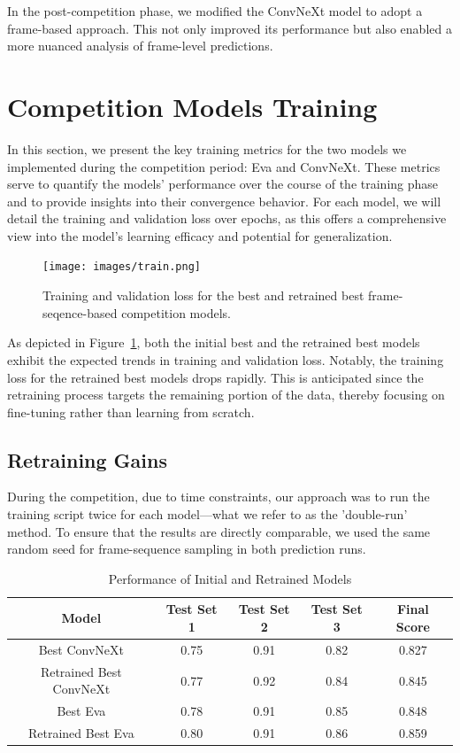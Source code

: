 \documentclass[a4paper,12pt,openright]{book}
\begin{document}
In the post-competition phase, we modified the ConvNeXt model to adopt a frame-based approach. This not only improved its performance but also enabled a more nuanced analysis of frame-level predictions.


\section{Competition Models Training}
In this section, we present the key training metrics for the two models we implemented during the competition period: Eva and ConvNeXt. These metrics serve to quantify the models' performance over the course of the training phase and to provide insights into their convergence behavior. For each model, we will detail the training and validation loss over epochs, as this offers a comprehensive view into the model's learning efficacy and potential for generalization.

\begin{figure}[!htb]
\centering
\texttt{[image: images/train.png]}
\caption{Training and validation loss for the best and retrained best frame-seqence-based competition models.}
\label{fig:training_validation_loss}
\end{figure}

As depicted in Figure~\ref{fig:training_validation_loss}, both the initial best and the retrained best models exhibit the expected trends in training and validation loss. Notably, the training loss for the retrained best models drops rapidly. This is anticipated since the retraining process targets the remaining portion of the data, thereby focusing on fine-tuning rather than learning from scratch.

\subsection{Retraining Gains}
During the competition, due to time constraints, our approach was to run the training script twice for each model—what we refer to as the 'double-run' method. To ensure that the results are directly comparable, we used the same random seed for frame-sequence sampling in both prediction runs.
\begin{table}[!htb]
\centering


\label{tab:retraining_gains}
\begin{tabular}{|c|c|c|c|c|}
\hline
Model & Test Set 1 & Test Set 2 & Test Set 3 & Final Score \\
\hline
Best ConvNeXt & 0.75 & 0.91 & 0.82 & 0.827 \\
\hline
Retrained Best ConvNeXt & 0.77 & 0.92 & 0.84 & 0.845 \\
\hline
Best Eva & 0.78 & 0.91 & 0.85 & 0.848 \\
\hline
Retrained Best Eva & 0.80 & 0.91 & 0.86 & 0.859 \\
\hline
\end{tabular}
\caption{Performance of Initial and Retrained Models}
\end{table}
\end{document}
